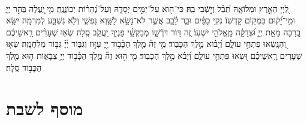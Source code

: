 \documentclass[twoside, openany, parskip=half, 11pt]{book}
\begin{document}
\begin{sometimes}

\\
%
לַ֭יְיָ הָאָ֣רֶץ וּמְלוֹאָ֑הּ תֵּ֝בֵ֗ל וְי֣שְֿׁבֵי בָֽהּ׃ 
כִּי־ה֖וּא עַל־יַמִּ֣ים יְסָדָ֑הּ וְעַל־נְ֝הָר֗וֹת יְכֽוֹנֲנֶֽהָ׃ 
מִ֥י ֖יַֽעֲלֶה בְּהַ֣ר יְיָ֑ וּמִ֥י־יָ֝ק֗וּם בִּמְק֥וֹם קָדְשֽׁוֹ׃ 
נְקִ֥י כַפַּ֗יִם וּבַ֢ר לֵ֫בָ֥ב אֲשֶׁ֤ר לֹֽא־נָשָׂ֣א לַשָּׁ֣וְא נַפְשִׁ֑י וְלֹ֖א נִשְׁבַּ֣ע לְמִרְמָֽה׃ 
יִשָּׂ֣א בְ֭רָכָה מֵאֵ֣ת יְיָ֑ וּ֝צְדָקָ֗ה מֵֽאֱלֹהֵ֥י יִשְׁעֽוֹ׃ 
זֶ֭ה דּ֣וֹר דֹּרְֿשָׁ֑ו מְבַקְשֵׁ֥֨י פָנֶי֖ךָ יַֽעֲקֹ֣ב סֶֽלָה׃ 
שְׂא֤וּ שְׁעָרִ֨ים רָֽאשֵׁיכֶ֗ם וְ֭הִנָּֽשְֿׂאוּ פִּתְחֵ֣י עוֹלָ֑ם וְ֝יָב֗וֹא מֶ֣לֶךְ הַכָּבֽוֹד׃ 
מִ֥י זֶה֘ מֶ֤לֶךְ הַכָּ֫ב֥וֹד יְ֖יָ עִזּ֣וּז וְגִבּ֑וֹר יְ֜יָ֗ גִּבּ֥וֹר מִלְחָמָֽה׃ 
שְׂא֤וּ שְׁעָרִים רָֽאשֵׁיכֶ֗ם וּ֭שְׂאוּ פִּתְחֵ֣י עוֹלָ֑ם וְ֝יָבֹ֗א מֶ֣לֶךְ הַכָּבֽוֹד׃ 
מִ֤י ה֣וּא זֶה֘ מֶ֢לֶךְ הַכָּ֫ב֥וֹד יְיָ֥ צְבָא֑וֹת ה֤וּא מֶ֖לֶךְ הַכָּב֣וֹד סֶֽלָה׃

\end{sometimes}



\etzchaim

\halfkaddish


\vspace{\baselineskip}


{\let\clearpage\relax 
\chapter[מוסף לשבת]{ מוסף לשבת }}

\amidaopening{\shabbosshuva}{}

\end{document}
